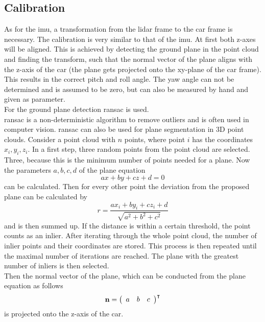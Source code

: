 \subsection{Calibration}
As for the \gls{imu}, a transformation from the \gls{lidar} frame to the car frame is necessary.
The calibration is very similar to that of the \gls{imu}.
At first both z-axes will be aligned.
This is achieved by detecting the ground plane in the point cloud and finding the transform, such that the normal vector of the plane aligns with the z-axis of the car (the plane gets projected onto the xy-plane of the car frame).
This results in the correct pitch and roll angle.
The yaw angle can not be determined and is assumed to be zero, but can also be measured by hand and given as parameter.\\
For the ground plane detection \gls{ransac} \cite{Fischler1981} is used.\\
\gls{ransac} is a non-deterministic algorithm to remove outliers and is often used in computer vision.
\gls{ransac} can also be used for plane segmentation in 3D point clouds.
Consider a point cloud with $n$ points, where point $i$ has the coordinates $x_i, y_i, z_i$.
In a first step, three random points from the point cloud are selected.
Three, because this is the minimum number of points needed for a plane.
Now the parameters $a, b, c, d$ of the plane equation
\begin{equation}
	ax + by + cz + d = 0
\end{equation}
can be calculated.
Then for every other point the deviation from the proposed plane can be calculated by
\begin{equation}
	r = \frac{ax_i + by_i + cz_i + d}{\sqrt{a^2 + b^2 + c^2}}
\end{equation}
and is then summed up.
If the distance is within a certain threshold, the point counts as an inlier.
After iterating through the whole point cloud, the number of inlier points and their coordinates are stored.
This process is then repeated until the maximal number of iterations are reached.
The plane with the greatest number of inliers is then selected.\\
Then the normal vector of the plane, which can be conducted from the plane equation as follows
\begin{equation}
	\vb{n} = \left(\begin{array}{lll} a & b & c \end{array}\right)^{\intercal}
\end{equation}
is projected onto the z-axis of the car.
